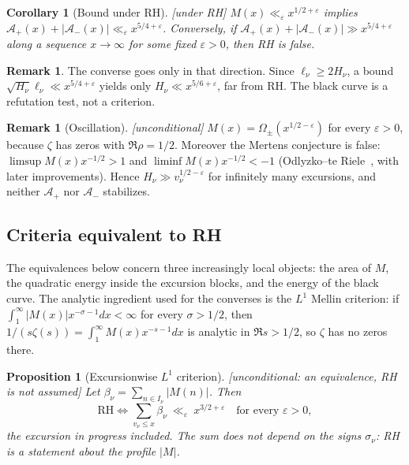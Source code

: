 \documentclass[11pt,reqno]{amsart}
\theoremstyle{plain}
\newtheorem{proposition}[theorem]{Proposition}
\newtheorem{corollary}[theorem]{Corollary}
\theoremstyle{definition}
\newtheorem{remark}[theorem]{Remark}
\newcommand{\Ap}{\mathcal{A}_{+}}
\newcommand{\Am}{\mathcal{A}_{-}}
\newcommand{\eps}{\varepsilon}
\begin{document}
\begin{corollary}[Bound under RH]
\label{cor:rh}
\emph{[under RH]} $M(x)\ll_\eps x^{1/2+\eps}$ implies
$\Ap(x)+|\Am(x)|\ll_\eps x^{5/4+\eps}$. Conversely, if
$\Ap(x)+|\Am(x)|\gg x^{5/4+\eps}$ along a sequence $x\to\infty$ for some
fixed $\eps>0$, then RH is false.
\end{corollary}

\begin{remark}
\label{rem:onedirection}
The converse goes only in that direction. Since $\ell_\nu\ge 2H_\nu$, a
bound $\sqrt{H_\nu}\ell_\nu\ll x^{5/4+\eps}$ yields only
$H_\nu\ll x^{5/6+\eps}$, far from RH. The black curve is a refutation test,
not a criterion.
\end{remark}

\begin{remark}[Oscillation]
\label{rem:omega}
\emph{[unconditional]} $M(x)=\Omega_{\pm}(x^{1/2-\eps})$ for every
$\eps>0$, because $\zeta$ has zeros with $\Re\rho=1/2$. Moreover the Mertens
conjecture is false: $\limsup M(x)x^{-1/2}>1$ and
$\liminf M(x)x^{-1/2}<-1$ (Odlyzko--te Riele~\cite{OtR}, with later
improvements). Hence $H_\nu\gg v_\nu^{1/2-\eps}$ for infinitely many
excursions, and neither $\Ap$ nor $\Am$ stabilizes.
\end{remark}

\subsection{Criteria equivalent to RH}
\label{subsec:criteria}

The equivalences below concern three increasingly local objects: the area of
$M$, the quadratic energy inside the excursion blocks, and the energy of the
black curve.  The analytic ingredient used for the converses is the $L^1$
Mellin criterion: if $\int_1^\infty|M(x)|x^{-\sigma-1}dx<\infty$ for every
$\sigma>1/2$, then $1/(s\zeta(s))=\int_1^\infty M(x)x^{-s-1}dx$ is analytic
in $\Re s>1/2$, so $\zeta$ has no zeros there.

\begin{proposition}[Excursionwise $L^1$ criterion]
\label{prop:L1}
\emph{[unconditional: an equivalence, RH is not assumed]} Let
$\beta_\nu=\sum_{n\in I_\nu}|M(n)|$. Then
\[
  \mathrm{RH}\iff \sum_{v_\nu\le x}\beta_\nu\ \ll_\eps\ x^{3/2+\eps}
  \quad\text{for every }\eps>0,
\]
the excursion in progress included. The sum does not depend on the signs
$\sigma_\nu$: RH is a statement about the profile $|M|$.
\end{proposition}
\end{document}
